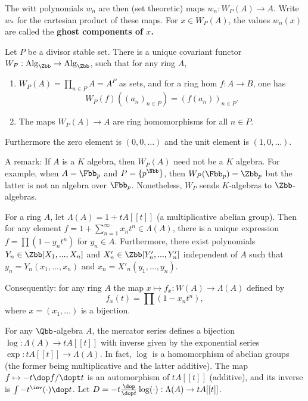 \documentclass{amsart}
\begin{document}
 The witt polynomials $w_n$ are then (set theoretic) maps $w_n : W_P(A) \to A$. Write $w_*$ for the cartesian product of these maps.  For $x\in W_P(A)$, the values $w_n(x)$ are called the \bf{ghost components of $x$}.

\begin{thm}
  Let $P$ be a divisor stable set. There is a unique covariant functor $W_P : \rm{Alg}_\Zbb \to \rm{Alg}_\Zbb$, such
  that for any ring $A$,
  \begin{enumerate}
    \item $W_P(A) = \prod_{n \in P} A = A^P$ as sets, and for a ring hom $f : A \to B$, one has
      \begin{equation*}
        W_P(f) ((a_n)_{n\in P})  = (f(a_n))_{n \in P}.
      \end{equation*}
    \item The maps $W_P(A) \to A$ are ring homomorphisms for all $n \in P$.
  \end{enumerate}
  Furthermore the zero element is  $(0,0,\ldots)$ and the unit element is $(1,0,\ldots)$.
\end{thm}

A remark: If $A$ is a $K$ algebra, then $W_P(A)$ need not be a $K$ algebra. For example, when $A = \Fbb_p$ and $P=\{
    p^\Nbb\}$, then $W_P(\Fbb_p)= \Zbb_p$ but the latter is not an algebra over $\Fbb_p$. Nonetheless, $W_P$ sends
    $K$-algebras to $\Zbb$-algebras.

    For a ring $A$, let $\Lambda (A) = 1 + t A[[t]]$ (a multiplicative abelian group). Then for any element $f= 1 +
    \sum_{n=1}^\infty x_n t^n  \in \Lambda(A)$, there is a unique expression $f = \prod (1 - y_n t^n)$ for $y_n \in A$.
    Furthermore, there exist polynomials $Y_n \in \Zbb[X_1,...,X_n]$ and $X'_n \in \Zbb[Y'_n,...,Y'_n]$ independent of
    $A$ such that $y_n = Y_n ( x_1 , ..., x_n )$ and $x_n = X'_n(y_1, ... , y_n)$.

    Consequently: for any ring $A$ the map $x \mapsto f_x : W(A) \to \Lambda(A)$ defined by
\begin{equation}
    f_x (t) = \prod (1-x_n t^n),
\end{equation}
where $x = (x_1, ...)$ is a bijection.


For any $\Qbb$-algebra $A$, the mercator series defines a bijection $\log : \Lambda(A) \to t A[[t]]$ with inverse given
by the exponential series $\exp : t A [[t]] \to \Lambda(A)$. In fact, $\log$ is a homomorphism of abelian groups (the
former being multiplicative and the latter additive). The map $f \mapsto -t \dop f / \dopt t $ is an automorphism of
$tA[[t]]$ (additive), and its inverse is $\int - t^\inv (\cdot ) \dop t$.  Let $D = -t \frac{\dop }{\dop t} \log
(\cdot): \Lambda(A) \to t A[[t]]$.


%
%
\end{document}
